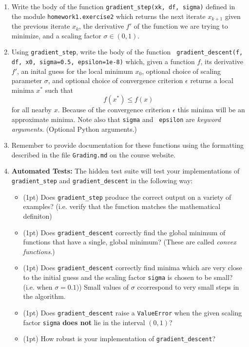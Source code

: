 \documentclass[12pt]{article}
\begin{document}
\begin{enumerate}
\item Write the body of the function {\tt gradient\_step(xk, df, sigma)} defined
  in the module {\tt homework1.exercise2} which returns the next iterate
  $x_{k+1}$ given the previous iterate $x_k$, the derivative $f'$ of the
  function we are trying to minimize, and a scaling factor $\sigma \in (0,1)$.
\item Using {\tt gradient\_step}, write the body of the function {\tt
    gradient\_descent(f, df, x0, sigma=0.5, epsilon=1e-8)} which, given a
  function $f$, its derivative $f'$, an inital guess for the local minimum
  $x_0$, optional choice of scaling parameter $\sigma$, and optional choice of
  convergence criterion $\epsilon$ returns a local minima $x^*$ such that
  \[
    f(x^*) \leq f(x)
  \]
  for all nearby $x$. Because of the convergence criterion $\epsilon$ this
  minima will be an approximate minima. Note also that {\tt sigma} and {\tt
    epsilon} are {\it keyword arguments}. (Optional Python arguments.)
\item Remember to provide documentation for these functions using the formatting
  described in the file {\tt Grading.md} on the course website.
\item {\bf Automated Tests:} The hidden test suite will test your
  implementations of {\tt gradient\_step} and {\tt gradient\_descent} in the
  following way:
  \begin{itemize}
    \item (1pt) Does {\tt gradient\_step} produce the correct output on a
      variety of examples? (i.e. verify that the function matches the
      mathematical definiton)
    \item (1pt) Does {\tt gradient\_descent} correctly find the global minimum
      of functions that have a single, global minimum? (These are called {\it
        convex functions}.)
    \item (1pt) Does {\tt gradient\_descent} correctly find minima which are
      very close to the initial guess and the scaling factor {\tt sigma} is
      chosen to be small? (i.e. when $\sigma = 0.1)$) Small values of $\sigma$
      ccorrespond to very small steps in the algorithm.
    \item (1pt) Does {\tt gradient\_descent} raise a {\tt ValueError} when the
      given scaling factor {\tt sigma} {\bf does not} lie in the interval
      $(0,1)$?
    \item (1pt) How robust is your implementation of {\tt gradient\_descent}?

\end{itemize}
\end{enumerate}
\end{document}
